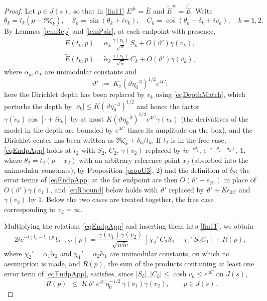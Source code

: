 \documentclass[10pt,a4paper]{amsart}
\def\a{\alpha}
\def\d{\delta}
\def\g{\gamma}
\def\ti{\tilde}
\def\to{\rightarrow}
\begin{document}
\begin{proof}
Let $p\in J(s)$, so that in \eqref{fin11} $E^\#=\bar E$ and $\ti E^\#=\bar{\ti E}$. Write
$$\theta_k=t_k(p-\Re\zeta_k),\quad S_k=\sin(\theta_k+iv_k),\quad C_k=\cos(\theta_k-\d_k+iv_k),\quad k=1,2.$$
By Lemmas \ref{lemRep} and \ref{lemPair}, at each endpoint with presence,
\begin{equation}
\begin{gathered}
E(t_k,p)=\a_k\,\frac{\g(v_k)}{\sqrt{w}}\,S_k+O(\vartheta')\g(v_k),\\
\ti E(t_k,p)=\ti\a_k\,\frac{\g(v_k)}{\sqrt{\ti w}}\,C_k+O(\vartheta')\g(v_k),
\end{gathered}
\label{eqEndpApp}
\end{equation}
where $\a_k,\ti\a_k$ are unimodular constants and
$$\vartheta'\ :=\ K_7\left(\vartheta\eta_0^{-3}\right)^{1/2}e^{4C}:$$
here the Dirichlet depth has been replaced by $v_k$ using \eqref{eqDepthMatch}, which perturbs the depth by $|\nu_k|\leq K(\vartheta\eta_0^{-3})^{1/2}$ and hence the factor $\g(\ti v_k)\cos[\cdot+i\ti v_k]$ by at most $K(\vartheta\eta_0^{-3})^{1/2}e^{4C}\g(v_k)$ (the derivatives of the model in the depth are bounded by $e^{4C}$ times its amplitude on the box), and the Dirichlet center has been written as $\Re\zeta_k+\d_k/t_k$. If $t_2$ is in the free case, \eqref{eqEndpApp} holds at $t_2$ with $S_2$, $C_2$, $\g(v_2)$ replaced by $ie^{-i\theta_2}$, $e^{-i(\theta_2-\d_2)}$, $1$, where $\theta_2=t_2(p-x_2)$ with an arbitrary reference point $x_2$ (absorbed into the unimodular constants), by Proposition \ref{propU3}, 2) and the definition of $\d_2$; the error terms of \eqref{eqEndpApp} at the far endpoint are then $O\left(\vartheta'+\epsilon_{2C}\right)$ in place of $O(\vartheta')\g(v_2)$, and \eqref{eqRbound} below holds with $\vartheta'$ replaced by $\vartheta'+K\epsilon_{2C}$ and $\g(v_2)$ by $1$. Below the two cases are treated together, the free case corresponding to $v_2=\infty$.

Multiplying the relations \eqref{eqEndpApp} and inserting them into \eqref{fin11}, we obtain
\begin{equation}
2ie^{-i(t_2-t_1)p}\,b_{t\to2t}(p)=\frac{\g(v_1)\g(v_2)}{\sqrt{w\ti w}}\,
\left[\chi_2' \,C_2S_1-\chi_1'\, S_2C_1\right]+R(p),
\label{eqModelB}
\end{equation}
where $\chi_2'=\a_1\ti\a_2$ and $\chi_1'=\a_2\ti\a_1$ are unimodular constants, on which no assumption is made, and $R(p)$, the sum of the products containing at least one error term of \eqref{eqEndpApp}, satisfies, since $|S_k|,|C_k|\leq\cosh v_k\leq e^{4C}$ on $J(s)$,
\begin{equation}
|R(p)|\ \leq\ K\,\vartheta'\,e^{4C}\eta_0^{-1/2}\,\g(v_1)\g(v_2),\qquad p\in J(s).
\label{eqRbound}
\end{equation}


\end{proof}
\end{document}
